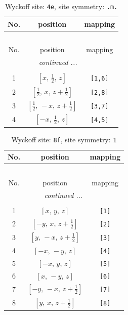 \documentclass[fleqn,8pt]{jsarticle}
\begin{document}
\begin{longtable}{ccc}
\caption{Wyckoff site: {\tt 4e}, site symmetry: {\tt .m.}}
 \\
 \hline \hline
No. & position & mapping \\ \hline \endfirsthead

\multicolumn{2}{l}{\tablename\ \thetable{}} \\
 \hline \hline
No. & position & mapping \\ \hline \endhead

 \hline \hline
\multicolumn{2}{r}{\footnotesize\it continued ...} \\ \endfoot

 \hline \hline
\multicolumn{2}{r}{} \\ \endlastfoot

1 & $\left[ x,\, \frac{1}{2},\, z \right]$ & {\tt [1,6]} \\ \hline
2 & $\left[ \frac{1}{2},\, x,\, z + \frac{1}{2} \right]$ & {\tt [2,8]} \\ \hline
3 & $\left[ \frac{1}{2},\, - x,\, z + \frac{1}{2} \right]$ & {\tt [3,7]} \\ \hline
4 & $\left[ - x,\, \frac{1}{2},\, z \right]$ & {\tt [4,5]} \\
\end{longtable}
\renewcommand{\arraystretch}{1.2}
\begin{longtable}{ccc}
\caption{Wyckoff site: {\tt 8f}, site symmetry: {\tt 1}}
 \\
 \hline \hline
No. & position & mapping \\ \hline \endfirsthead

\multicolumn{2}{l}{\tablename\ \thetable{}} \\
 \hline \hline
No. & position & mapping \\ \hline \endhead

 \hline \hline
\multicolumn{2}{r}{\footnotesize\it continued ...} \\ \endfoot

 \hline \hline
\multicolumn{2}{r}{} \\ \endlastfoot

1 & $\left[ x,\, y,\, z \right]$ & {\tt [1]} \\ \hline
2 & $\left[ - y,\, x,\, z + \frac{1}{2} \right]$ & {\tt [2]} \\ \hline
3 & $\left[ y,\, - x,\, z + \frac{1}{2} \right]$ & {\tt [3]} \\ \hline
4 & $\left[ - x,\, - y,\, z \right]$ & {\tt [4]} \\ \hline
5 & $\left[ - x,\, y,\, z \right]$ & {\tt [5]} \\ \hline
6 & $\left[ x,\, - y,\, z \right]$ & {\tt [6]} \\ \hline
7 & $\left[ - y,\, - x,\, z + \frac{1}{2} \right]$ & {\tt [7]} \\ \hline
8 & $\left[ y,\, x,\, z + \frac{1}{2} \right]$ & {\tt [8]} \\
\end{longtable}
\end{document}
